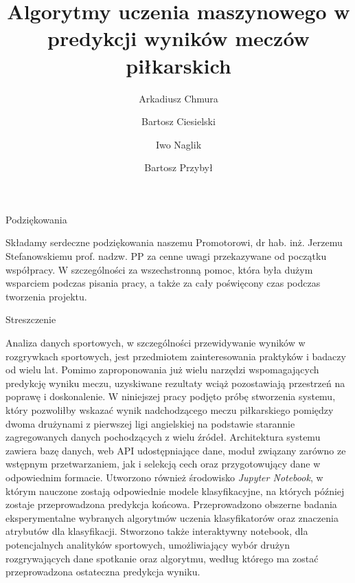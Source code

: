 \documentclass[polish,bachelor,a4paper,oneside]{ppfcmthesis}
\author{%
   Arkadiusz Chmura \album{136690} \and 
   Bartosz Ciesielski \album{136694}\and
   Iwo Naglik \album{136774}\and
   Bartosz Przybył \album{136785}}
\title{Algorytmy uczenia maszynowego w predykcji wyników meczów piłkarskich}
\begin{document}

\frontmatter\pagestyle{empty}%
\maketitle\cleardoublepage%


\newpage\null\thispagestyle{empty}\newpage
\begin{center}
    \huge Podziękowania
\end{center}
Składamy serdeczne podziękowania naszemu Promotorowi, dr hab. inż. Jerzemu Stefanowskiemu prof. nadzw. PP za cenne uwagi przekazywane od początku współpracy. W szczególności za wszechstronną pomoc, która była dużym wsparciem podczas pisania pracy, a także za cały poświęcony czas podczas tworzenia projektu.


\newpage\null\thispagestyle{empty}\newpage
\newpage
\begin{center}
    \huge Streszczenie
\end{center}
Analiza danych sportowych, w szczególności przewidywanie wyników w rozgrywkach sportowych, jest przedmiotem zainteresowania praktyków i badaczy od wielu lat. Pomimo zaproponowania już wielu narzędzi wspomagających predykcję wyniku meczu, uzyskiwane rezultaty wciąż pozostawiają przestrzeń na poprawę i doskonalenie. W niniejszej pracy podjęto próbę stworzenia systemu, który pozwoliłby wskazać wynik nadchodzącego meczu piłkarskiego pomiędzy dwoma drużynami z pierwszej ligi angielskiej na podstawie starannie zagregowanych danych pochodzących z wielu źródeł. Architektura systemu zawiera bazę danych, web API udostępniające dane, moduł związany zarówno ze wstępnym przetwarzaniem, jak i selekcją cech oraz przygotowujący dane w odpowiednim formacie. Utworzono również środowisko \textit{Jupyter Notebook}, w którym nauczone zostają odpowiednie modele klasyfikacyjne, na których później zostaje przeprowadzona predykcja końcowa. Przeprowadzono obszerne badania eksperymentalne wybranych algorytmów uczenia klasyfikatorów oraz znaczenia atrybutów dla klasyfikacji. Stworzono także interaktywny notebook, dla potencjalnych analityków sportowych, umożliwiający wybór drużyn rozgrywających dane spotkanie oraz algorytmu, według którego ma zostać przeprowadzona ostateczna predykcja wyniku.\\\\
\end{document}

